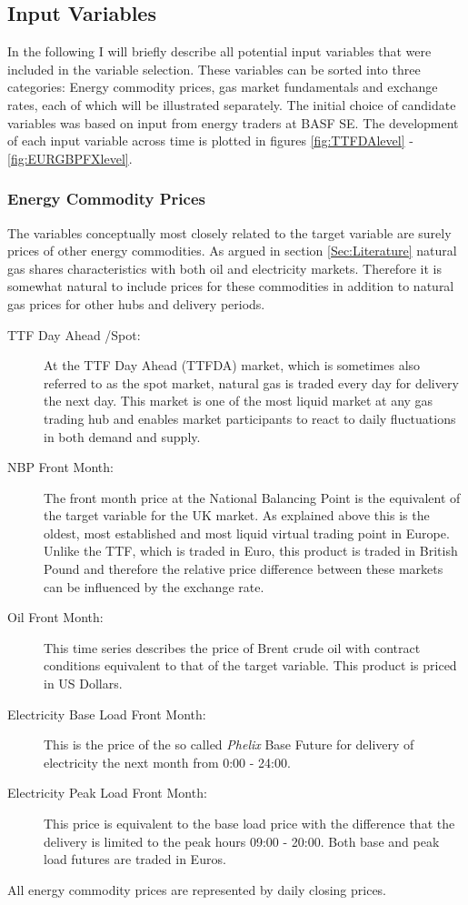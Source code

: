 \subsection{Input Variables}\label{Sec:Input}
In the following I will briefly describe all potential input variables that were included in the variable selection. These variables can be sorted into three categories: Energy commodity prices, gas market fundamentals and exchange rates, each of which will be illustrated separately. The initial choice of candidate variables was based on input from energy traders at BASF SE. The development of each input variable across time is plotted in figures  \ref{fig:TTFDAlevel} - \ref{fig:EURGBPFXlevel}.
\subsubsection{Energy Commodity Prices}
The variables conceptually most closely related to the target variable are surely prices of other energy commodities. As argued in  section \ref{Sec:Literature} natural gas shares characteristics with both oil and electricity markets. Therefore it is somewhat natural to include prices for these commodities in addition to natural gas prices for other hubs and delivery periods.
\begin{description}
\item[TTF Day Ahead /Spot:] At the TTF Day Ahead (TTFDA) market, which is sometimes also referred to as the spot market, natural gas is traded every day for delivery the next day. This market is one of the most liquid market at any gas trading hub and enables market participants to react to daily fluctuations in both demand and supply.
\item[NBP Front Month:] The front month price at the National Balancing Point is the equivalent of the target variable for the UK market. As explained above this is the oldest, most established and most liquid virtual trading point in Europe. Unlike the TTF, which is traded in Euro, this product is traded in British Pound and therefore the relative price difference between these markets can be influenced by the exchange rate.
\item[Oil Front Month:] This time series describes the price of  Brent crude oil with contract conditions equivalent to that of the target variable. This product is priced in US Dollars.
\item[Electricity Base Load Front Month:] This is the price of the so called \textit{Phelix} Base Future for delivery of electricity the next month from 0:00 - 24:00.
\item[Electricity Peak Load Front Month:] This price is equivalent to the base load price with the difference that the delivery is limited to the peak hours 09:00 - 20:00. Both base and peak load futures are traded in Euros.
\end{description}
All energy commodity prices are represented by daily closing prices.
